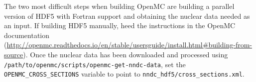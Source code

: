 \documentclass[10pt]{article}
\begin{document}
The two most difficult steps when building OpenMC are building a parallel version of HDF5 with Fortran support and obtaining the nuclear data needed as an input.
If building HDF5 manually, heed the instructions in the OpenMC documentation (\url{http://openmc.readthedocs.io/en/stable/usersguide/install.html#building-from-source}). Once the nuclear data has been downloaded and processed using \verb+/path/to/openmc/scripts/openmc-get-nndc-data+, set the \verb+OPENMC_CROSS_SECTIONS+ variable to point to \verb+nndc_hdf5/cross_sections.xml+.
\end{document}
